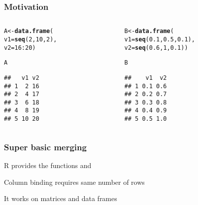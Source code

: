 \documentclass[12pt]{beamer}\usepackage[]{graphicx}\usepackage[]{color}
\makeatletter
\newcommand{\hlnum}[1]{\textcolor[rgb]{0.686,0.059,0.569}{#1}}%
\newcommand{\hlopt}[1]{\textcolor[rgb]{0,0,0}{#1}}%
\newcommand{\hlstd}[1]{\textcolor[rgb]{0.345,0.345,0.345}{#1}}%
\newcommand{\hlkwb}[1]{\textcolor[rgb]{0.69,0.353,0.396}{#1}}%
\newcommand{\hlkwc}[1]{\textcolor[rgb]{0.333,0.667,0.333}{#1}}%
\newcommand{\hlkwd}[1]{\textcolor[rgb]{0.737,0.353,0.396}{\textbf{#1}}}%
\newenvironment{kframe}{%
 \def\at@end@of@kframe{}%
 \ifinner\ifhmode%
  \def\at@end@of@kframe{\end{minipage}}%
  \begin{minipage}{\columnwidth}%
 \fi\fi%
 \def\FrameCommand##1{\hskip\@totalleftmargin \hskip-\fboxsep
 \colorbox{shadecolor}{##1}\hskip-\fboxsep
     \hskip-\linewidth \hskip-\@totalleftmargin \hskip\columnwidth}%
 \MakeFramed {\advance\hsize-\width
   \@totalleftmargin\z@ \linewidth\hsize
   \@setminipage}}%
 {\par\unskip\endMakeFramed%
 \at@end@of@kframe}
\newenvironment{knitrout}{}{} %
\makeatother
\begin{document}
\begin{frame}[fragile]
\frametitle{Motivation}

\begin{columns}[t]
\begin{column}{0.4\textwidth}
\begin{knitrout}\footnotesize
{}\color{fgcolor}\begin{kframe}
\begin{alltt}
\hlstd{A} \hlkwb{<-} \hlkwd{data.frame}\hlstd{(}
  \hlkwc{v1} \hlstd{=} \hlkwd{seq}\hlstd{(}\hlnum{2}\hlstd{,} \hlnum{10}\hlstd{,} \hlnum{2}\hlstd{),}
  \hlkwc{v2} \hlstd{=} \hlnum{16}\hlopt{:}\hlnum{20}\hlstd{)}

\hlstd{A}
\end{alltt}
\begin{verbatim}
##   v1 v2
## 1  2 16
## 2  4 17
## 3  6 18
## 4  8 19
## 5 10 20
\end{verbatim}
\end{kframe}
\end{knitrout}
\end{column}

\begin{column}{0.5\textwidth}
\begin{knitrout}\footnotesize
{}\color{fgcolor}\begin{kframe}
\begin{alltt}
\hlstd{B} \hlkwb{<-} \hlkwd{data.frame}\hlstd{(}
  \hlkwc{v1} \hlstd{=} \hlkwd{seq}\hlstd{(}\hlnum{0.1}\hlstd{,} \hlnum{0.5}\hlstd{,} \hlnum{0.1}\hlstd{),}
  \hlkwc{v2} \hlstd{=} \hlkwd{seq}\hlstd{(}\hlnum{0.6}\hlstd{,} \hlnum{1}\hlstd{,} \hlnum{0.1}\hlstd{))}

\hlstd{B}
\end{alltt}
\begin{verbatim}
##    v1  v2
## 1 0.1 0.6
## 2 0.2 0.7
## 3 0.3 0.8
## 4 0.4 0.9
## 5 0.5 1.0
\end{verbatim}
\end{kframe}
\end{knitrout}
\end{column}
\end{columns}

\end{frame}


\begin{frame}[fragile]
\frametitle{Super basic merging}

\bi
  \item R provides the functions {\hilit {}} and {\hilit {}}
  \item Column binding requires same number of rows
  \item It works on matrices and data frames
\ei

\end{frame}
\end{document}
